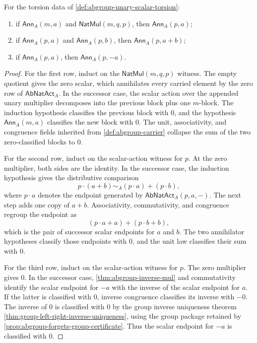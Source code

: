 \begin{lemma}
\label{lem:abgroup-annihilator-transport-laws}
For the torsion data of \autoref{def:abgroup-unary-scalar-torsion}:
\begin{enumerate}
  \item if $\mathsf{Ann}_A(m,a)$ and $\mathsf{NatMul}(m,q,p)$, then $\mathsf{Ann}_A(p,a)$;
  \item if $\mathsf{Ann}_A(p,a)$ and $\mathsf{Ann}_A(p,b)$, then $\mathsf{Ann}_A(p,a+b)$;
  \item if $\mathsf{Ann}_A(p,a)$, then $\mathsf{Ann}_A(p,-a)$.
\end{enumerate}
\end{lemma}
\begin{proof}
For the first row, induct on the $\mathsf{NatMul}(m,q,p)$ witness. The empty quotient gives the zero scalar, which annihilates every carried element by the zero row of $\mathsf{AbNatAct}_A$. In the successor case, the scalar action over the appended unary multiplier decomposes into the previous block plus one $m$-block. The induction hypothesis classifies the previous block with $0$, and the hypothesis $\mathsf{Ann}_A(m,a)$ classifies the new block with $0$. The unit, associativity, and congruence fields inherited from \autoref{def:abgroup-carrier} collapse the sum of the two zero-classified blocks to $0$.

For the second row, induct on the scalar-action witness for $p$. At the zero multiplier, both sides are the identity. In the successor case, the induction hypothesis gives the distributive comparison
$$
p\cdot(a+b)\sim_A (p\cdot a)+(p\cdot b),
$$
where $p\cdot a$ denotes the endpoint generated by $\mathsf{AbNatAct}_A(p,a,-)$. The next step adds one copy of $a+b$. Associativity, commutativity, and congruence regroup the endpoint as
$$
(p\cdot a+a)+(p\cdot b+b),
$$
which is the pair of successor scalar endpoints for $a$ and $b$. The two annihilator hypotheses classify those endpoints with $0$, and the unit law classifies their sum with $0$.

For the third row, induct on the scalar-action witness for $p$. The zero multiplier gives $0$. In the successor case, \autoref{thm:abgroup-inverse-mul} and commutativity identify the scalar endpoint for $-a$ with the inverse of the scalar endpoint for $a$. If the latter is classified with $0$, inverse congruence classifies its inverse with $-0$. The inverse of $0$ is classified with $0$ by the group inverse uniqueness theorem \autoref{thm:group-left-right-inverse-uniqueness}, using the group package retained by \autoref{prop:abgroup-forgets-group-certificate}. Thus the scalar endpoint for $-a$ is classified with $0$.
\end{proof}

